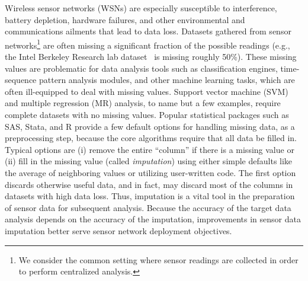 
Wireless sensor networks (WSNs) are especially susceptible to interference,
battery depletion, hardware failures, and other environmental and communications ailments
that lead to data loss.  Datasets gathered from sensor networks\footnote{We consider the common setting where sensor readings are collected in order to perform centralized analysis.}
 are
often missing a significant fraction of the possible readings
(e.g., the Intel Berkeley Research lab dataset~\cite{berkeley2004lab}
is missing roughly 50\%).
These missing values are problematic for data analysis tools such as
classification engines, time-sequence pattern analysis modules, and
other machine learning tasks, which are often ill-equipped to deal
with missing values.  Support vector machine (SVM)
and multiple regression (MR) analysis,
to name but a few examples, require complete datasets with no missing
values.  Popular statistical packages such as SAS, Stata, and R
provide a few default options for handling missing data, as a
preprocessing step, because the core algorithms require that all data be filled
in.  Typical options are (i) remove the entire ``column'' if there is a
missing value or (ii) fill in the missing value (called {\em
imputation}) using either simple defaults like the average of
neighboring values or utilizing user-written code.  
The first option discards
otherwise useful data, and in fact, may discard most of the columns in
datasets with high data loss.  
Thus, imputation is a vital tool in the
preparation of sensor data for subsequent analysis. 
Because the
accuracy of the target data analysis depends on the accuracy of the
imputation, improvements in sensor data imputation better serve
sensor network deployment objectives.


